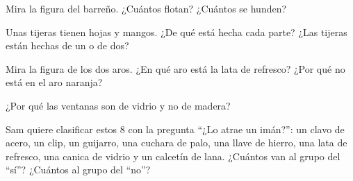 \begin{exercise}[$\star$]\label{exo:g1:materials-around-us:7}
Mira la figura del barreño. ¿Cuántos  flotan? ¿Cuántos se
hunden?
\end{exercise}

\begin{exercise}[$\star$]\label{exo:g1:materials-around-us:8}
Unas tijeras tienen hojas y mangos. ¿De qué  está hecha cada
parte? ¿Las tijeras están hechas de un  o de dos?
\end{exercise}

\begin{exercise}[$\star$]\label{exo:g1:materials-around-us:9}
Mira la figura de los dos aros. ¿En qué aro está la lata de refresco?
¿Por qué no está en el aro naranja?
\end{exercise}

\begin{exercise}[$\star\star$]\label{exo:g1:materials-around-us:10}
¿Por qué las ventanas son de vidrio y no de madera?
\end{exercise}

\begin{exercise}[$\star\star$]\label{exo:g1:materials-around-us:11}
Sam quiere clasificar estos 8  con la pregunta ``¿Lo atrae un
imán?'': un clavo de acero, un clip, un guijarro, una cuchara de palo,
una llave de hierro, una lata de refresco, una canica de vidrio y un
calcetín de lana. ¿Cuántos  van al grupo del ``sí''? ¿Cuántos al
grupo del ``no''?
\end{exercise}
